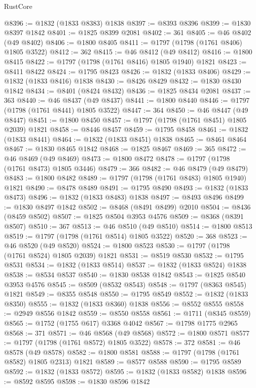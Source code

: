 \begin{lexlean}{RustCore}
\begin{coremodule}
@8396 := @1832 (@1833 @8383) @1838
@8397 := @8393 @8396
@8399 := @1830 @8397 @1842
@8401 := @1825 @8399 @2081
@8402 := 361
@8405 := @46 @8402 (@49 @8402)
@8406 := @1800 @8405
@8411 := @1797 (@1798 (@1761 @8406) @1805 @3522)
@8412 := 362
@8415 := @46 @8412 (@49 @8412)
@8416 := @1800 @8415
@8422 := @1797 (@1798 (@1761 @8416) @1805 @1940) @1821
@8423 := @8411 @8422
@8424 := @1795 @8423
@8426 := @1832 (@1833 @8406)
@8429 := @1832 (@1833 @8416) @1838
@8430 := @8426 @8429
@8432 := @1830 @8430 @1842
@8434 := @8401 (@8424 @8432)
@8436 := @1825 @8434 @2081
@8437 := 363
@8440 := @46 @8437 (@49 @8437)
@8441 := @1800 @8440
@8446 := @1797 (@1798 (@1761 @8441) @1805 @3522)
@8447 := 364
@8450 := @46 @8447 (@49 @8447)
@8451 := @1800 @8450
@8457 := @1797 (@1798 (@1761 @8451) @1805 @2039) @1821
@8458 := @8446 @8457
@8459 := @1795 @8458
@8461 := @1832 (@1833 @8441)
@8464 := @1832 (@1833 @8451) @1838
@8465 := @8461 @8464
@8467 := @1830 @8465 @1842
@8468 := @1825 @8467
@8469 := 365
@8472 := @46 @8469 (@49 @8469)
@8473 := @1800 @8472
@8478 := @1797 (@1798 (@1761 @8473) @1805 @3446)
@8479 := 366
@8482 := @46 @8479 (@49 @8479)
@8483 := @1800 @8482
@8489 := @1797 (@1798 (@1761 @8483) @1805 @1940) @1821
@8490 := @8478 @8489
@8491 := @1795 @8490
@8493 := @1832 (@1833 @8473)
@8496 := @1832 (@1833 @8483) @1838
@8497 := @8493 @8496
@8499 := @1830 @8497 @1842
@8502 := @8468 (@8491 @8499) @2010
@8504 := @8436 (@8459 @8502)
@8507 := @1825 @8504 @3953 @4576
@8509 := @8368 (@8391 @8507)
@8510 := 367
@8513 := @46 @8510 (@49 @8510)
@8514 := @1800 @8513
@8519 := @1797 (@1798 (@1761 @8514) @1805 @3522)
@8520 := 368
@8523 := @46 @8520 (@49 @8520)
@8524 := @1800 @8523
@8530 := @1797 (@1798 (@1761 @8524) @1805 @2039) @1821
@8531 := @8519 @8530
@8532 := @1795 @8531
@8534 := @1832 (@1833 @8514)
@8537 := @1832 (@1833 @8524) @1838
@8538 := @8534 @8537
@8540 := @1830 @8538 @1842
@8543 := @1825 @8540 @3953 @4576
@8545 := @8509 (@8532 @8543)
@8548 := @1797 (@8363 @8545) @1821
@8549 := @8355 @8548
@8550 := @1795 @8549
@8552 := @1832 (@1833 @8350)
@8555 := @1832 (@1833 @8360) @1838
@8556 := @8552 @8555
@8558 := @2949 @8556 @1842
@8559 := @8550 @8558
@8561 := @1711 (@8345 @8559)
@8565 := @1752 (@1755 @617) @3368 @4042
@8567 := @1798 @1775 @2965
@8568 := 371
@8571 := @46 @8568 (@49 @8568)
@8572 := @1800 @8571
@8577 := @1797 (@1798 (@1761 @8572) @1805 @3522)
@8578 := 372
@8581 := @46 @8578 (@49 @8578)
@8582 := @1800 @8581
@8588 := @1797 (@1798 (@1761 @8582) @1805 @2313) @1821
@8589 := @8577 @8588
@8590 := @1795 @8589
@8592 := @1832 (@1833 @8572)
@8595 := @1832 (@1833 @8582) @1838
@8596 := @8592 @8595
@8598 := @1830 @8596 @1842

\end{coremodule}
\end{lexlean}
